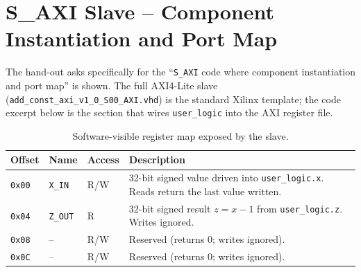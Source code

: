 \documentclass[11pt,letterpaper]{article}
\begin{document}
\section{S\_AXI Slave -- Component Instantiation and Port Map}

The hand-out asks specifically for the ``\texttt{S\_AXI} code where
component instantiation and port map'' is shown. The full AXI4-Lite slave
(\texttt{add\_const\_axi\_v1\_0\_S00\_AXI.vhd}) is the standard Xilinx
template; the code excerpt below is the section that wires
\texttt{user\_logic} into the AXI register file.

\begin{table}[H]
    \centering
    \caption{Software-visible register map exposed by the slave.}
    \label{tab:regmap}
    \begin{tabular}{lllp{8cm}}
        \toprule
        \textbf{Offset} & \textbf{Name} & \textbf{Access} & \textbf{Description} \\
        \midrule
        \texttt{0x00} & \texttt{X\_IN}  & R/W & 32-bit signed value driven into \texttt{user\_logic.x}. Reads return the last value written. \\
        \texttt{0x04} & \texttt{Z\_OUT} & R   & 32-bit signed result $z = x - 1$ from \texttt{user\_logic.z}. Writes ignored. \\
        \texttt{0x08} & --              & R/W & Reserved (returns $0$; writes ignored). \\
        \texttt{0x0C} & --              & R/W & Reserved (returns $0$; writes ignored). \\
        \bottomrule
    \end{tabular}
\end{table}
\end{document}
